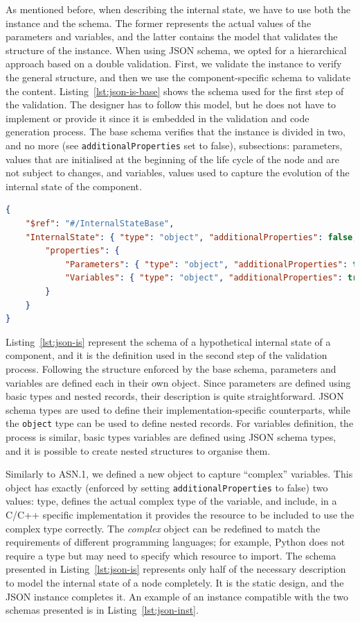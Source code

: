 As mentioned before, when describing the internal state, we have to use both the instance and the schema. The former represents the actual values of the parameters and variables, and the latter contains the model that validates the structure of the instance. When using JSON schema, we opted for a hierarchical approach based on a double validation. First, we validate the instance to verify the general structure, and then we use the component-specific schema to validate the content. Listing~\ref{lst:json-is-base} shows the schema used for the first step of the validation. The designer has to follow this model, but he does not have to implement or provide it since it is embedded in the validation and code generation process. The base schema verifies that the instance is divided in two, and no more (see \texttt{additionalProperties} set to false), subsections: parameters, values that are initialised at the beginning of the life cycle of the node and are not subject to changes, and variables, values used to capture the evolution of the internal state of the component.

\begin{lstlisting}[language=JSON, caption={Base schema of the internal state defined using JSON schema},label=lst:json-is-base]
{
	"$ref": "#/InternalStateBase",
	"InternalState": { "type": "object", "additionalProperties": false,
		"properties": {
			"Parameters": { "type": "object", "additionalProperties": true },
			"Variables": { "type": "object", "additionalProperties": true }
		}
	}
}
\end{lstlisting}

Listing~\ref{lst:json-is} represent the schema of a hypothetical internal state of a component, and it is the definition used in the second step of the validation process. Following the structure enforced by the base schema, parameters and variables are defined each in their own object. Since parameters are defined using basic types and nested records, their description is quite straightforward. JSON schema types are used to define their implementation-specific counterparts, while the \texttt{object} type can be used to define nested records. For variables definition, the process is similar, basic types variables are defined using JSON schema types, and it is possible to create nested structures to organise them.

Similarly to ASN.1, we defined a new object to capture ``complex'' variables. This object has exactly (enforced by setting \texttt{ad\-di\-tion\-al\-Prop\-er\-ties} to false) two values: type, defines the actual complex type of the variable, and include, in a C/C++ specific implementation it provides the resource to be included to use the complex type correctly. The \textit{complex} object can be redefined to match the requirements of different programming languages; for example, Python does not require a type but may need to specify which resource to import. The schema presented in Listing~\ref{lst:json-is} represents only half of the necessary description to model the internal state of a node completely. It is the static design, and the JSON instance completes it. An example of an instance compatible with the two schemas presented is in Listing~\ref{lst:json-inst}.

